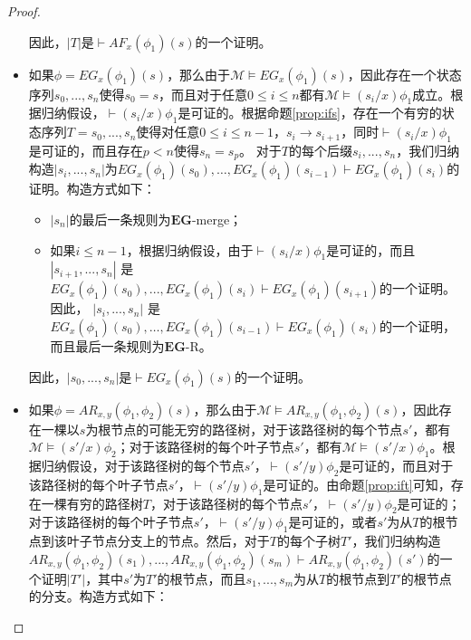 \begin{proof}
\begin{itemize}
		因此，$|T|$是$\vdash AF_x(\phi_1)(s)$的一个证明。
		
		\item 如果$\phi = EG_x(\phi_1)(s)$，那么由于$\mathcal{M}\models EG_x(\phi_1)(s)$，因此存在一个状态序列$s_0,...,s_n$使得$s_0=s$，而且对于任意$0\le i\le n$都有$\mathcal{M}\models (s_i/x)\phi_1$成立。根据归纳假设，$\vdash (s_i/x)\phi_1$是可证的。根据命题\ref{prop:ifs}，存在一个有穷的状态序列$T=s_0,...,s_n$使得对任意$0\le i\le n-1$，$s_i \longrightarrow s_{i+1}$，同时$\vdash (s_i/x)\phi_1$是可证的，而且存在$p<n$使得$s_n=s_p$。
		对于$T$的每个后缀$s_i,...,s_n$，我们归纳构造$|s_i,...,s_n|$为$EG_x(\phi_1)(s_0),\ldots, EG_x(\phi_1)(s_{i-1}) \vdash EG_x(\phi_1)(s_i)$的证明。构造方式如下：
			
		\begin{itemize}

				\item $|s_n|$的最后一条规则为$\mathbf{EG}$-merge；
				
				\item 如果$i \le n-1$，根据归纳假设，由于$\vdash (s_i/x)\phi_1$是可证的，而且 $|s_{i+1}, ..., s_n|$ 是 $EG_x(\phi_1)(s_0), ..., EG_x(\phi_1)(s_i) \vdash EG_x(\phi_1)(s_{i+1})$的一个证明。因此， $|s_i, ..., s_n|$ 是 $EG_x(\phi_1)(s_0),\ldots, EG_x(\phi_1)(s_{i-1}) \vdash EG_x(\phi_1)(s_i)$的一个证明，而且最后一条规则为$\mathbf{EG}$-\textsf{R}。
				
		\end{itemize}
			
		因此，$|s_0,...,s_n|$是$\vdash EG_x(\phi_1)(s)$的一个证明。

		\item 如果$\phi = AR_{x,y}(\phi_1, \phi_2)(s)$，那么由于$\mathcal{M}\models AR_{x,y}(\phi_1, \phi_2)(s)$，因此存在一棵以$s$为根节点的可能无穷的路径树，对于该路径树的每个节点$s'$，都有$\mathcal{M}\models (s'/x)\phi_2$；对于该路径树的每个叶子节点$s'$，都有$\mathcal{M}\models (s'/x)\phi_1$。根据归纳假设，对于该路径树的每个节点$s'$，$\vdash (s'/y)\phi_2$是可证的，而且对于该路径树的每个叶子节点$s'$，$\vdash (s'/y)\phi_1$是可证的。由命题\ref{prop:ift}可知，存在一棵有穷的路径树$T$，对于该路径树的每个节点$s'$，$\vdash (s'/y)\phi_2$是可证的；对于该路径树的每个叶子节点$s'$，$\vdash (s'/y)\phi_1$是可证的，或者$s'$为从$T$的根节点到该叶子节点分支上的节点。然后，对于$T$的每个子树$T'$，我们归纳构造$AR_{x,y}(\phi_1, \phi_2)(s_1), ..., AR_{x,y}(\phi_1,
		\phi_2)(s_m) \vdash AR_{x,y}(\phi_1, \phi_2)(s')$的一个证明$|T'|$，其中$s'$为$T'$的根节点，而且$s_1,...,s_m$为从$T$的根节点到$T'$的根节点的分支。构造方式如下：
		\begin{itemize}


\end{itemize}
\end{itemize}
\end{proof}

